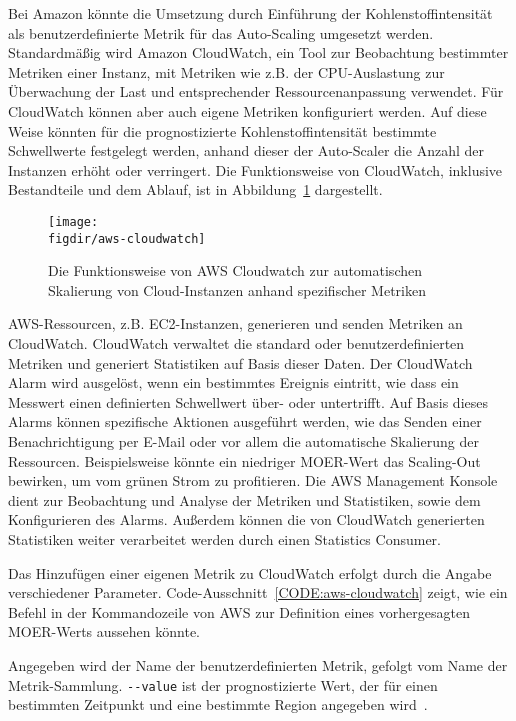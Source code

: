 Bei Amazon könnte die Umsetzung durch Einführung der Kohlenstoffintensität als benutzerdefinierte Metrik für das Auto-Scaling umgesetzt werden.
Standardmäßig wird Amazon CloudWatch, ein Tool zur Beobachtung bestimmter Metriken einer Instanz, mit Metriken wie z.B. der CPU-Auslastung zur Überwachung der Last und entsprechender Ressourcenanpassung verwendet.
Für CloudWatch können aber auch eigene Metriken konfiguriert werden.
Auf diese Weise könnten für die prognostizierte Kohlenstoffintensität bestimmte Schwellwerte festgelegt werden, anhand dieser der Auto-Scaler die Anzahl der Instanzen erhöht oder verringert.
Die Funktionsweise von CloudWatch, inklusive Bestandteile und dem Ablauf, ist in Abbildung~\ref{FIG:aws-cloudwatch} dargestellt.
\begin{figure}
 \caption{Die Funktionsweise von AWS Cloudwatch zur automatischen Skalierung von Cloud-Instanzen anhand spezifischer Metriken~\cite{AmazonWebServices.20240320T16:42:17.000Z}}
 {\texttt{[image: \\figdir/aws-cloudwatch]}}
 \label{FIG:aws-cloudwatch}
\end{figure}
AWS-Ressourcen, z.B. EC2-Instanzen, generieren und senden Metriken an CloudWatch.
CloudWatch verwaltet die standard oder benutzerdefinierten Metriken und generiert Statistiken auf Basis dieser Daten.
Der CloudWatch Alarm wird ausgelöst, wenn ein bestimmtes Ereignis eintritt, wie dass ein Messwert einen definierten Schwellwert über- oder untertrifft.
Auf Basis dieses Alarms können spezifische Aktionen ausgeführt werden, wie das Senden einer Benachrichtigung per E-Mail oder vor allem die automatische Skalierung der Ressourcen.
Beispielsweise könnte ein niedriger \ac{MOER}-Wert das Scaling-Out bewirken, um vom grünen Strom zu profitieren.
Die AWS Management Konsole dient zur Beobachtung und Analyse der Metriken und Statistiken, sowie dem Konfigurieren des Alarms.
Außerdem können die von CloudWatch generierten Statistiken weiter verarbeitet werden durch einen Statistics Consumer.

Das Hinzufügen einer eigenen Metrik zu CloudWatch erfolgt durch die Angabe verschiedener Parameter.
Code-Ausschnitt~\ref{CODE:aws-cloudwatch} zeigt, wie ein Befehl in der Kommandozeile von AWS zur Definition eines vorhergesagten \ac{MOER}-Werts aussehen könnte.

Angegeben wird der Name der benutzerdefinierten Metrik, gefolgt vom Name der Metrik-Sammlung.
\lstinline[columns=fixed]{--value} ist der prognostizierte Wert, der für einen bestimmten Zeitpunkt und eine bestimmte Region angegeben wird~\cite{AmazonWebServices.20240320T16:42:17.000Z}.

